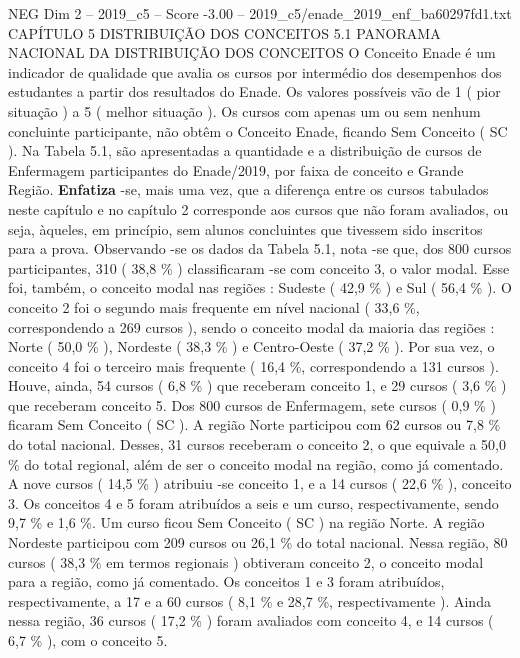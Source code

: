 \begin{textsample}{NEG Dim 2 – 2019\_c5 – Score -3.00 – 2019\_c5/enade\_2019\_enf\_ba60297fd1.txt}  \label{ex:f2_neg_093}
CAPÍTULO 5 DISTRIBUIÇÃO DOS CONCEITOS 5.1 PANORAMA NACIONAL DA DISTRIBUIÇÃO DOS CONCEITOS O Conceito Enade é um indicador de qualidade que avalia os cursos por intermédio dos desempenhos dos estudantes a partir dos resultados do Enade.
Os valores possíveis vão de 1 ( pior situação ) a 5 ( melhor situação ).
Os cursos com apenas um ou sem nenhum concluinte participante, não obtêm o Conceito Enade, ficando Sem Conceito ( SC ).
Na Tabela 5.1, são apresentadas a quantidade e a distribuição de cursos de Enfermagem participantes do Enade/2019, por faixa de conceito e Grande Região. \textbf{Enfatiza} -se, mais uma vez, que a diferença entre os cursos tabulados neste capítulo e no capítulo 2 corresponde aos cursos que não foram avaliados, ou seja, àqueles, em princípio, sem alunos concluintes que tivessem sido inscritos para a prova.
Observando -se os dados da Tabela 5.1, nota -se que, dos 800 cursos participantes, 310 ( 38,8 \% ) classificaram -se com conceito 3, o valor modal.
Esse foi, também, o conceito modal nas regiões : Sudeste ( 42,9 \% ) e Sul ( 56,4 \% ).
O conceito 2 foi o segundo mais frequente em nível nacional ( 33,6 \%, correspondendo a 269 cursos ), sendo o conceito modal da maioria das regiões : Norte ( 50,0 \% ), Nordeste ( 38,3 \% ) e Centro-Oeste ( 37,2 \% ).
Por sua vez, o conceito 4 foi o terceiro mais frequente ( 16,4 \%, correspondendo a 131 cursos ).
Houve, ainda, 54 cursos ( 6,8 \% ) que receberam conceito 1, e 29 cursos ( 3,6 \% ) que receberam conceito 5.
Dos 800 cursos de Enfermagem, sete cursos ( 0,9 \% ) ficaram Sem Conceito ( SC ).
A região Norte participou com 62 cursos ou 7,8 \% do total nacional.
Desses, 31 cursos receberam o conceito 2, o que equivale a 50,0 \% do total regional, além de ser o conceito modal na região, como já comentado.
A nove cursos ( 14,5 \% ) atribuiu -se conceito 1, e a 14 cursos ( 22,6 \% ), conceito 3.
Os conceitos 4 e 5 foram atribuídos a seis e um curso, respectivamente, sendo 9,7 \% e 1,6 \%.
Um curso ficou Sem Conceito ( SC ) na região Norte.
A região Nordeste participou com 209 cursos ou 26,1 \% do total nacional.
Nessa região, 80 cursos ( 38,3 \% em termos regionais ) obtiveram conceito 2, o conceito modal para a região, como já comentado.
Os conceitos 1 e 3 foram atribuídos, respectivamente, a 17 e a 60 cursos ( 8,1 \% e 28,7 \%, respectivamente ).
Ainda nessa região, 36 cursos ( 17,2 \% ) foram avaliados com conceito 4, e 14 cursos ( 6,7 \% ), com o conceito 5.

\end{textsample}

